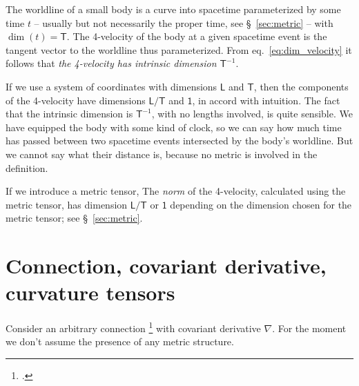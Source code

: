 \documentclass[\ifafour a4paper,12pt,\else a5paper,10pt,\fi%
onecolumn,oneside,article,%
british%
]{memoir}
\theoremstyle{remark}
\theoremstyle{innote}
\newcommand*{\citep}{\footcites}
\renewcommand*{\|}[1][]{\nonscript\,#1\vert\nonscript\;\mathopen{}}
\newcommand*{\sect}{\S}%
\newcommand*{\eqn}{eq.}%
\newcommand*{\Un}{\textsf{1}}
\newcommand*{\Le}{\textsf{L}}
\newcommand*{\Ti}{\textsf{T}}
\newcommand*{\nab}{\nabla}
\begin{document}
\medskip

The worldline of a small body is a curve into spacetime parameterized by
some time $t$ -- usually but not necessarily the proper time, see
\sect~\ref{sec:metric} -- with $\dim(t) = \Ti$. The 4-velocity of the body
at a given spacetime event is the tangent vector to the worldline thus
parameterized. From \eqn~\eqref{eq:dim_velocity} it follows that \emph{the
  4-velocity has intrinsic dimension \textnormal{$\Ti^{-1}$}}.

If we use a system of coordinates with dimensions $\Le$ and $\Ti$, then the
components of the 4-velocity have dimensions $\Le/\Ti$ and $\Un$, in accord
with intuition. The fact that the intrinsic dimension is $\Ti^{-1}$, with
no lengths involved, is quite sensible. We have equipped the body with some
kind of clock, so we can say how much time has passed between two spacetime
events intersected by the body's worldline. But we cannot say what their
distance is, because no metric is involved in the definition.

If we introduce a metric tensor, The \emph{norm} of the 4-velocity,
calculated using the metric tensor, has dimension $\Le/\Ti$ or $\Un$
depending on the dimension chosen for the metric tensor; see
\sect~\ref{sec:metric}.






\section{Connection, covariant derivative, curvature tensors}
\label{sec:connection}

Consider an arbitrary connection
\citep[\sect~V.B]{choquetbruhatetal1977_r1996} with covariant derivative
$\nab$. For the moment we don't assume the presence of any metric
structure.
\end{document}
